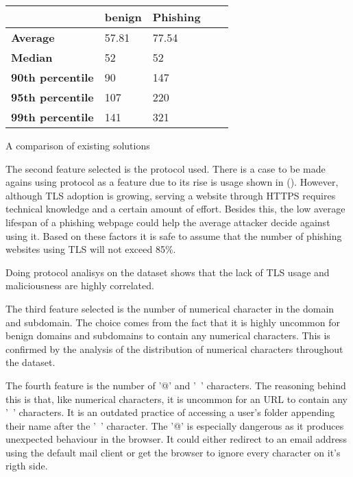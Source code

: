 \begin{singlespace}
	\small
	\begin{center}
		\label{tab:URL_SIZE_ANALISYS}
		\begin{tabular}{ | m{8em} | m{13em} | m{8.5em} | m{2.3em} | m{5em} | }
			\hline
			                         & \textbf{benign} & \textbf{Phishing} \\
			\hline
			\textbf{Average}         & 57.81           & 77.54             \\
			\hline
			\textbf{Median}          & 52              & 52                \\
			\hline
			\textbf{90th percentile} & 90              & 147               \\
			\hline
			\textbf{95th percentile} & 107             & 220               \\
			\hline
			\textbf{99th percentile} & 141             & 321               \\
			\hline
		\end{tabular}
		\captionsetup{type=table}\caption{A comparison of existing solutions \citep{INTELLIGENT_PHISHING_ANFIS}}
	\end{center}
\end{singlespace}


The second feature selected is the protocol used. There is a case to be made agains using protocol as a feature due to its rise is usage shown in (). However, although TLS adoption is growing, serving a website through HTTPS requires technical knowledge and a certain amount of effort. Besides this, the low average lifespan of a phishing webpage could help the average attacker decide against using it. Based on these factors it is safe to assume that the number of phishing websites using TLS will not exceed 85\%.

Doing protocol analisys on the dataset shows that the lack of TLS usage and maliciousness are highly correlated.

The third feature selected is the number of numerical character in the domain and subdomain. The choice comes from the fact that it is highly uncommon for benign domains and subdomains to contain any numerical characters. This is confirmed by the analysis of the distribution of numerical characters throughout the dataset.

The fourth feature is the number of '@' and '~' characters. The reasoning behind this is that, like numerical characters, it is uncommon for an URL to contain any '~' characters. It is an outdated practice of accessing a user's folder appending their name after the '~' character.
The '@' is especially dangerous as it produces unexpected behaviour in the browser. It could either redirect to an email address using the default mail client or get the browser to ignore every character on it's rigth side.

